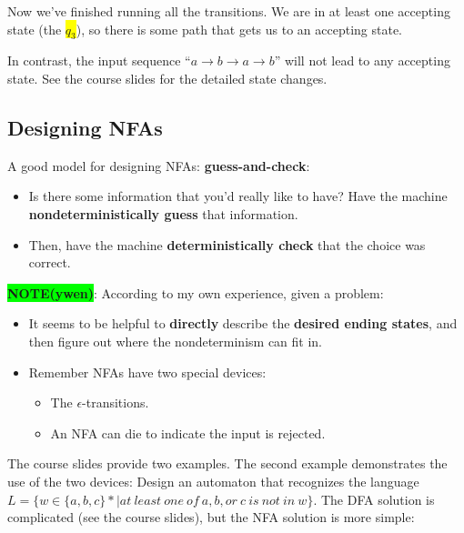 \documentclass[12pt, letterpaper, oneside]{book}
\begin{document}
Now we've finished running all the transitions. We are in at least one accepting state (the \colorbox{yellow}{$q_3$}),
so there is some path that gets us to an accepting state.

In contrast, the input sequence ``$a \rightarrow b \rightarrow a \rightarrow b$'' will not lead to any accepting state.
See the course slides for the detailed state changes.

\subsection{Designing NFAs}

A good model for designing NFAs: \textbf{guess-and-check}:
\begin{itemize}
  \item Is there some information that you'd really like to have? Have the machine \textbf{nondeterministically guess}
        that information.
  \item Then, have the machine \textbf{deterministically check} that the choice was correct.
\end{itemize}

\colorbox{lime}{\textbf{NOTE(ywen)}}: According to my own experience, given a problem:
\begin{itemize}
  \item It seems to be helpful to \textbf{directly} describe the \textbf{desired ending states}, and then figure out
        where the nondeterminism can fit in.
  \item Remember NFAs have two special devices:
        \begin{itemize}
          \item The $\epsilon$-transitions.
          \item An NFA can die to indicate the input is rejected.
        \end{itemize}
\end{itemize}

The course slides provide two examples. The second example demonstrates the use of the two devices: Design an automaton
that recognizes the language $L = \{ w \in \{a, b, c\}* | at \ least \ one \ of \ a, b, or \ c \ is \ not \ in \ w \}$.
The DFA solution is complicated (see the course slides), but the NFA solution is more simple:

\end{document}
